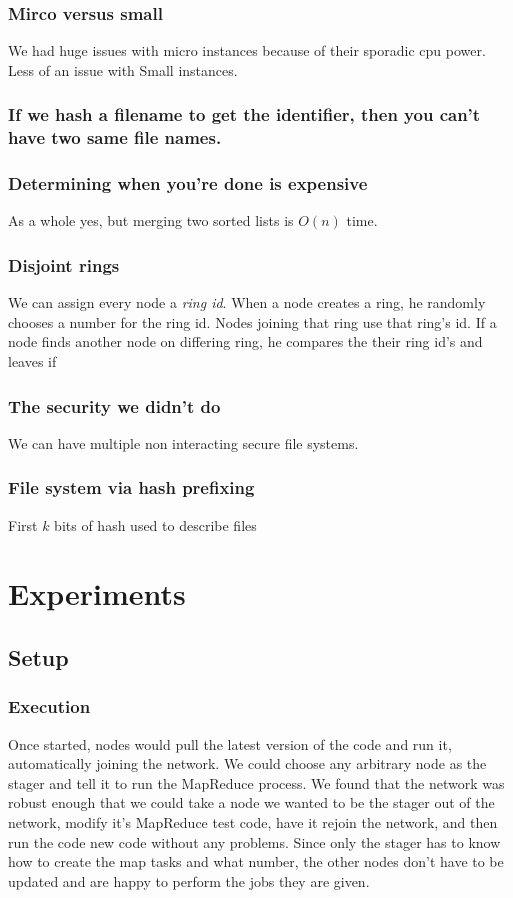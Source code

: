 \documentclass[conference, compsocconf, letterpaper]{IEEEtran}
\begin{document}
\subsubsection{Mirco versus small}
We had huge issues with micro instances because of their sporadic cpu power.  Less of an issue with Small instances.


\subsubsection{If we hash a filename to get the identifier, then you can't have two same file names.}

\subsubsection{Determining when you're done is expensive}
As a whole yes, but merging two sorted lists is $O(n)$ time. 


\subsubsection{Disjoint rings}
We can assign every node a \emph{ring id}.  When a node creates a ring, he randomly chooses a number for the ring id.  Nodes joining that ring use that ring's id.  If a node finds another node on differing ring, he compares the their ring id's and leaves if  

\subsubsection{The security we didn't do}
We can have multiple non interacting secure file systems.


\subsubsection{File system via hash prefixing}
First $k$ bits of hash used to describe files

\section{Experiments}

\subsection{Setup}
\subsubsection{Execution}
Once started, nodes would pull the latest version of the code and run it, automatically joining the network.  We could choose any arbitrary node as the stager and tell it to run the MapReduce process. We found that the network was robust enough that we could take a node we wanted to be the stager out of the network, modify it's MapReduce test code, have it rejoin the network, and then run the code new code without any problems. Since only the stager has to know how to create the map tasks  and what number, the other nodes don't have to be updated and are happy to perform the jobs they are given.
\end{document}
